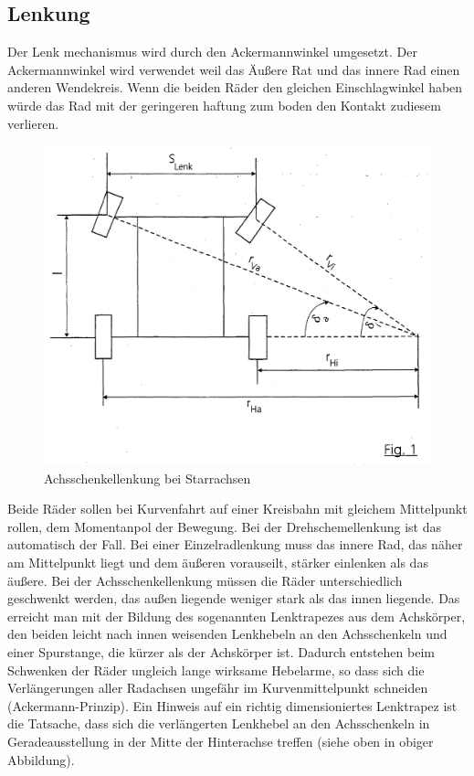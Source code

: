 \subsection{Lenkung}
Der Lenk mechanismus wird durch den Ackermannwinkel umgesetzt.
Der Ackermannwinkel wird verwendet weil das Äußere Rat und das innere Rad einen anderen Wendekreis. Wenn die beiden Räder den gleichen Einschlagwinkel haben würde das Rad mit der geringeren haftung zum boden den Kontakt zudiesem verlieren.\\
\begin{figure}[htp]
    \centering
    \includegraphics[width=(\textwidth/2)]{images/Ackermann.png}
    \caption{Achsschenkellenkung bei Starrachsen}
    \label{fig:Achsschenkellenkung bei Starrachsen}
\end{figure}
Beide Räder sollen bei Kurvenfahrt auf einer Kreisbahn mit gleichem Mittelpunkt rollen, dem Momentanpol der Bewegung. Bei der Drehschemellenkung ist das automatisch der Fall. Bei einer Einzelradlenkung muss das innere Rad, das näher am Mittelpunkt liegt und dem äußeren vorauseilt, stärker einlenken als das äußere. Bei der Achsschenkellenkung müssen die Räder unterschiedlich geschwenkt werden, das außen liegende weniger stark als das innen liegende. Das erreicht man mit der Bildung des sogenannten Lenktrapezes aus dem Achskörper, den beiden leicht nach innen weisenden Lenkhebeln an den Achsschenkeln und einer Spurstange, die kürzer als der Achskörper ist. Dadurch entstehen beim Schwenken der Räder ungleich lange wirksame Hebelarme, so dass sich die Verlängerungen aller Radachsen ungefähr im Kurvenmittelpunkt schneiden (Ackermann-Prinzip). Ein Hinweis auf ein richtig dimensioniertes Lenktrapez ist die Tatsache, dass sich die verlängerten Lenkhebel an den Achsschenkeln in Geradeausstellung in der Mitte der Hinterachse treffen (siehe oben in obiger Abbildung).\\

